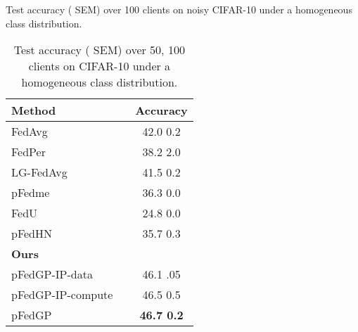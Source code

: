 \documentclass{article}
\begin{document}
\begin{table}[!t]
\parbox{.45\linewidth}{
\setlength{\tabcolsep}{3pt}
\small
\caption{Test accuracy ( SEM) over 100 clients on noisy CIFAR-10 under a homogeneous class distribution.}
\vskip 0.15in
\centering
\begin{tabular}{l c c} 
    \toprule
    \multicolumn{1}{l}{Method} && \multicolumn{1}{c}{Accuracy}\\
    \midrule
    FedAvg \cite{mcmahan2017communication} && 42.0  0.2 \\
    \midrule
    FedPer \cite{arivazhagan2019federated} && 38.2  2.0 \\
    LG-FedAvg \cite{liang2020think} && 41.5  0.2 \\
    pFedme \cite{t2020personalized} && 36.3  0.0 \\
    FedU  \cite{dinh2021fedu} && 24.8  0.0 \\
    pFedHN \cite{shamsian2021personalized_icml} && 35.7  0.3 \\
    \midrule
    \textbf{Ours} &&\\
    pFedGP-IP-data && 46.1  .05 \\
    pFedGP-IP-compute && 46.5  0.5 \\
    pFedGP && \textbf{46.7  0.2} \\
    \bottomrule
\end{tabular}
\label{tab:noisy_cifar10}
}
\hfill
\parbox{.45\linewidth}{
\setlength{\tabcolsep}{3pt}
\caption{Test accuracy ( SEM) over 50, 100 clients on CIFAR-10 under a homogeneous class distribution.}
\vskip 0.15in
\centering
{}
\label{tab:cifar10_10classes}
}
\end{table}
\end{document}
